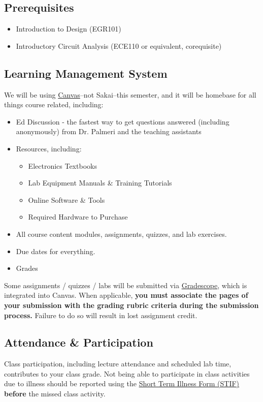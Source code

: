 \documentclass[10pt]{report}
\begin{document}
\subsection*{Prerequisites}
\begin{itemize}
    \item Introduction to Design (EGR101)
    \item Introductory Circuit Analysis (ECE110 or equivalent, corequisite)
\end{itemize}

\subsection*{Learning Management System}
We will be using \href{https://canvas.duke.edu/}{Canvas}--not Sakai--this
semester, and it will be homebase for all things course related, including:
\begin{itemize}
    \item Ed Discussion - the fastest way to get questions answered (including
    anonymously) from Dr. Palmeri and the teaching assistants
    \item Resources, including:
    \begin{itemize}
        \item Electronics Textbooks
        \item Lab Equipment Manuals \& Training Tutorials
        \item Online Software \& Tools
        \item Required Hardware to Purchase
    \end{itemize}
    \item All course content modules, assignments, quizzes, and lab exercises.
    \item Due dates for everything.
    \item Grades
\end{itemize}

Some assignments / quizzes / labs will be submitted via
\href{https://www.gradescope.com/}{Gradescope}, which is integrated into Canvas.
When applicable, \textbf{you must associate the pages of your submission with
the grading rubric criteria during the submission process.}  Failure to do so
will result in lost assignment credit.

\subsection*{Attendance \& Participation}
Class participation, including lecture attendance and scheduled lab time,
contributes to your class grade.   Not being able to participate in class
activities due to illness should be reported using the
\href{http://www.pratt.duke.edu/undergrad/policies/3531}{Short Term Illness Form
(STIF)} \textbf{before} the missed class activity.
\end{document}
